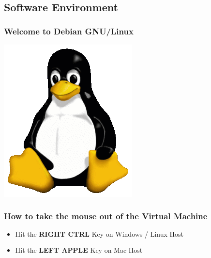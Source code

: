 \subsection{Software Environment}


{
\begin{frame}
\frametitle{Welcome to Debian GNU/Linux}
\begin{center}
\includegraphics[height=0.5\paperheight]{../Art/Tux.png}
\end{center}
\end{frame}
}

{
\begin{frame}
\frametitle{How to take the mouse out of the Virtual Machine}
\begin{itemize}
\item Hit the \textbf{RIGHT CTRL} Key on Windows / Linux Host
\item Hit the \textbf{LEFT APPLE} Key on Mac Host
\end{itemize}
\end{frame}
}

